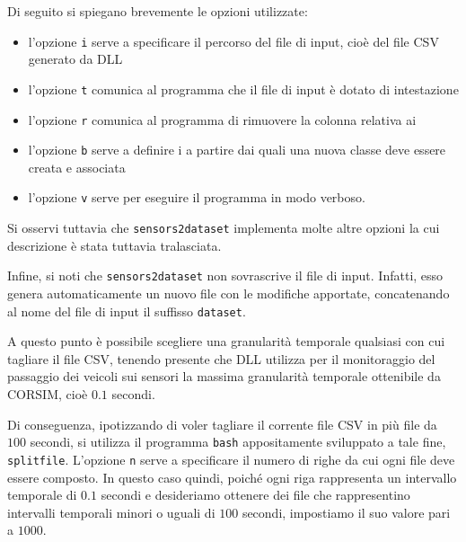 \vspace*{8pt}
Di seguito si spiegano brevemente le opzioni utilizzate:
\begin{itemize}
	\item l'opzione \lstinline[]|i| serve a specificare il percorso del file di input, cioè del file \acs{CSV} generato da  \acs{DLL}
	\item l'opzione \lstinline[]|t| comunica al programma che il file di input è dotato di intestazione
	\item l'opzione \lstinline[]|r| comunica al programma di rimuovere la colonna relativa ai \emph{}
	\item l'opzione \lstinline[]|b| serve a definire i \emph{} a partire dai quali una nuova classe deve essere creata e associata
	\item l'opzione \lstinline[]|v| serve per eseguire il programma in modo verboso.
\end{itemize}
Si osservi tuttavia che \lstinline[]|sensors2dataset| implementa molte altre opzioni la cui descrizione è stata tuttavia tralasciata.

Infine, si noti che \lstinline[]|sensors2dataset| non sovrascrive il file di input. Infatti, esso genera automaticamente un nuovo file con le modifiche apportate, concatenando al nome del file di input il suffisso \lstinline[]|dataset|.

A questo punto è possibile scegliere una granularità temporale qualsiasi con cui tagliare il file \acs{CSV}, tenendo presente che  \acs{DLL} utilizza per il monitoraggio del passaggio dei veicoli sui sensori la massima granularità temporale ottenibile da \acs{CORSIM}, cioè $0.1$ secondi.

Di conseguenza, ipotizzando di voler tagliare il corrente file \acs{CSV} in più file da $100$ secondi, si utilizza il programma \lstinline[]|bash| appositamente sviluppato a tale fine, \lstinline[]|splitfile|.
\vspace*{8pt}
L'opzione \lstinline[]|n| serve a specificare il numero di righe da cui ogni file deve essere composto. In questo caso quindi, poiché ogni riga rappresenta un intervallo temporale di $0.1$ secondi e desideriamo ottenere dei file che rappresentino intervalli temporali minori o uguali di $100$ secondi, impostiamo il suo valore pari a $1000$.

